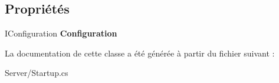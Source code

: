 \subsection*{Propriétés}
\begin{DoxyCompactItemize}
\item 
\mbox{\label{class_mediwatch_1_1_server_1_1_startup_ae3d0512feacc2872ab0ec4d5082626a6}} 
I\+Configuration {\bfseries Configuration}
\end{DoxyCompactItemize}


La documentation de cette classe a été générée à partir du fichier suivant \+:\begin{DoxyCompactItemize}
\item 
Server/Startup.\+cs\end{DoxyCompactItemize}

